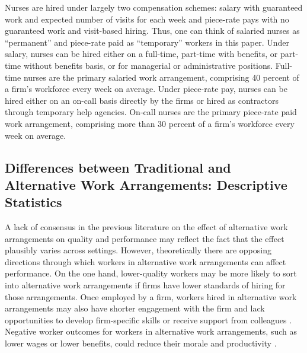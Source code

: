 \documentclass[final,12pt]{article}
\begin{document}
Nurses are hired under largely two compensation schemes: salary with guaranteed work and expected number of visits for each week and piece-rate pays with no guaranteed work and visit-based hiring.
Thus, one can think of salaried nurses as ``permanent'' and piece-rate paid as ``temporary'' workers in this paper.
Under salary, nurses can be hired either on a full-time, part-time with benefits, or part-time without benefits basis, or for managerial or administrative positions.
Full-time nurses are the primary salaried work arrangement, comprising 40 percent of a firm's workforce every week on average.
Under piece-rate pay, nurses can be hired either on an on-call basis directly by the firms or hired as contractors through temporary help agencies.
On-call nurses are the primary piece-rate paid work arrangement, comprising more than 30 percent of a firm's workforce every week on average.





\subsection{Differences between Traditional and Alternative Work Arrangements: Descriptive Statistics} \label{sec:desc_diff_nurses} %

A lack of consensus in the previous literature on the effect of alternative work arrangements on quality and performance may reflect the fact that the effect plausibly varies across settings.
However, theoretically there are opposing directions through which workers in alternative work arrangements can affect performance.
On the one hand, lower-quality workers may be more likely to sort into alternative work arrangements if firms have lower standards of hiring for those arrangements.
Once employed by a firm, workers hired in alternative work arrangements may also have shorter engagement with the firm and lack opportunities to develop firm-specific skills \citep{Broschak2006, Cuyper2008}
or receive support from colleagues \citep{Witte2003}.
Negative worker outcomes for workers in alternative work arrangements, such as lower wages or lower benefits, could reduce their morale and productivity \citep{Harley1994, Hockenberry2016}.
\end{document}
